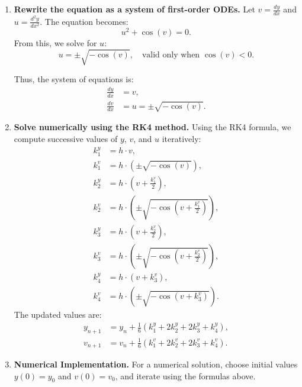 \documentclass[journal]{IEEEtran}
\begin{document}
    \begin{enumerate}
        \item \textbf{Rewrite the equation as a system of first-order ODEs.}
        Let \( v = \frac{dy}{dx} \) and \( u = \frac{d^2y}{dx^2} \). The equation becomes:
        \[ u^2 + \cos(v) = 0. \]
        From this, we solve for \( u \):
        \[ u = \pm \sqrt{-\cos(v)}, \quad \text{valid only when } \cos(v) < 0. \]

        Thus, the system of equations is:
        \begin{align*}
            \frac{dy}{dx} &= v, \\
            \frac{dv}{dx} &= u = \pm \sqrt{-\cos(v)}.
        \end{align*}

        \item \textbf{ Solve numerically using the RK4 method.}
        Using the RK4 formula, we compute successive values of \( y \), \( v \), and \( u \) iteratively:
        \begin{align*}
            k_1^y &= h \cdot v, \\
            k_1^v &= h \cdot \left(\pm \sqrt{-\cos(v)}\right), \\
            k_2^y &= h \cdot \left(v + \frac{k_1^v}{2}\right), \\
            k_2^v &= h \cdot \left(\pm \sqrt{-\cos\left(v + \frac{k_1^v}{2}\right)}\right), \\
            k_3^y &= h \cdot \left(v + \frac{k_2^v}{2}\right), \\
            k_3^v &= h \cdot \left(\pm \sqrt{-\cos\left(v + \frac{k_2^v}{2}\right)}\right), \\
            k_4^y &= h \cdot \left(v + k_3^v\right), \\
            k_4^v &= h \cdot \left(\pm \sqrt{-\cos\left(v + k_3^v\right)}\right).
        \end{align*}
        The updated values are:
        \begin{align*}
            y_{n+1} &= y_n + \frac{1}{6}\left(k_1^y + 2k_2^y + 2k_3^y + k_4^y\right), \\
            v_{n+1} &= v_n + \frac{1}{6}\left(k_1^v + 2k_2^v + 2k_3^v + k_4^v\right).
        \end{align*}

        \item \textbf{ Numerical Implementation.}
        For a numerical solution, choose initial values \( y(0) = y_0 \) and \( v(0) = v_0 \), and iterate using the formulas above.
    \end{enumerate} \\
\end{document}
